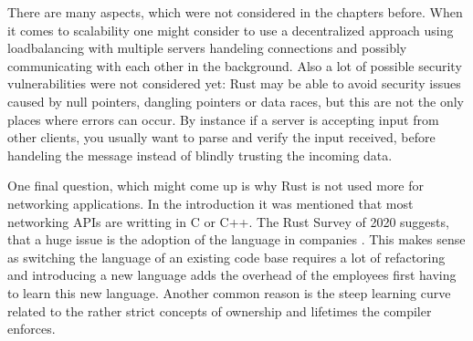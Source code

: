 There are many aspects, which were not considered in the chapters before. When it comes to scalability one might
consider to use a decentralized approach using loadbalancing with multiple servers handeling connections and possibly
communicating with each other in the background. Also a lot of possible security vulnerabilities were not considered
yet: Rust may be able to avoid security issues caused by null pointers, dangling pointers or data races, but this are
not the only places where errors can occur. By instance if a server is accepting input from other clients, you usually
want to parse and verify the input received, before handeling the message instead of blindly trusting the incoming
data.

One final question, which might come up is why Rust is not used more for networking applications. In the introduction
it was mentioned that most networking APIs are writting in C or C++. The Rust Survey of 2020 suggests, that a huge
issue is the adoption of the language in companies \cite{rust-survey}. This makes sense as switching the language of an
existing code base requires a lot of refactoring and introducing a new language adds the overhead of the employees
first having to learn this new language. Another common reason is the steep learning curve related to the rather strict
concepts of ownership and lifetimes the compiler enforces.
